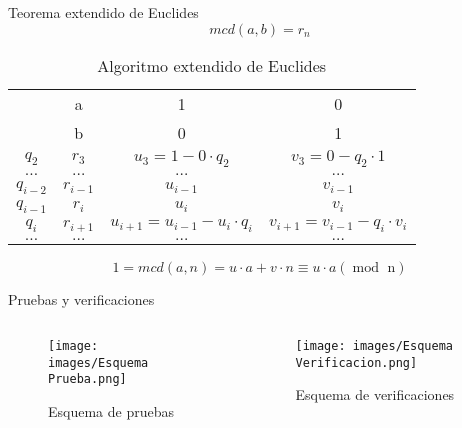 \documentclass[8pt,xcolor=dvipsnames]{beamer}
\begin{document}

\begin{frame}[fragile]{Teorema extendido de Euclides}
    $$mcd(a, b) = r_{n}$$
    \begin{table}[ht]
        \centering
        \begin{tabular}{c c|c c}
             & a & 1 & 0 \\
             & b & 0 & 1 \\
             $q_{2}$ & $r_{3}$ & $u_{3} = 1 - 0 \cdot q_{2}$ & $v_{3} = 0 - q_{2} \cdot 1$ \\
             $\dots$ & $\dots$ & $\dots$ & $\dots$ \\
             $q_{i-2}$ & $r_{i-1}$ & $u_{i-1}$ & $v_{i-1}$ \\
             $q_{i-1}$ & $r_{i}$ & $u_{i}$ & $v_{i}$ \\
             $q_{i}$ & $r_{i+1}$ & $u_{i+1} = u_{i-1} - u_{i} \cdot q_{i}$ & $v_{i+1} = v_{i-1} - q_{i} \cdot v_{i}$ \\
             $\dots$ & $\dots$ & $\dots$ & $\dots$ \\
        \end{tabular}
        \caption{Algoritmo extendido de Euclides}
    \end{table}
    $$1 = mcd(a, n) = u \cdot a + v \cdot n \equiv u \cdot a (\operatorname{mod} \text{ n})$$
\end{frame}


\begin{frame}[fragile]{Pruebas y verificaciones}
    \begin{columns}
        \begin{column}{0.45\textwidth}
            \begin{figure}
                \centering
                \texttt{[image: images/Esquema Prueba.png]}
                \caption{Esquema de pruebas}
            \end{figure}
        \end{column}
        \begin{column}{0.45\textwidth}
            \begin{figure}
                \centering
                \texttt{[image: images/Esquema Verificacion.png]}
                \caption{Esquema de verificaciones}
            \end{figure}
        \end{column}
    \end{columns}
\end{frame}
\end{document}
